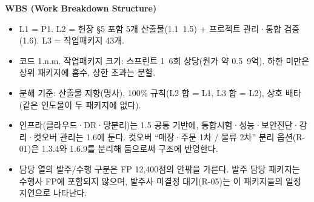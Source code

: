\documentclass[10pt,a4paper]{article}
\begin{document}
\clearpage
\begin{center}\bfseries\large WBS (Work Breakdown Structure)\end{center}
\begin{fieldbox}
\ifwbblank
{}\par\vspace{4mm}
\par\vspace{4mm}
\par\vspace{4mm}
\par\vspace{4mm}
\par\vspace{2mm}
\else
\begin{itemize}
\item L1 = P1. L2 = 헌장 §5 포함 5개 산출물(1.1~1.5) + 프로젝트 관리·통합 검증(1.6). L3 = 작업패키지 43개.
\item 코드 1.n.m. 작업패키지 크기: 스프린트 1~6회 상당(원가 약 0.5~9억). 하한 미만은 상위 패키지에 흡수, 상한 초과는 분할.
\item 분해 기준: 산출물 지향(명사), 100\% 규칙(L2 합 = L1, L3 합 = L2), 상호 배타(같은 인도물이 두 패키지에 없다).
\item 인프라(클라우드·DR·망분리)는 1.5 공통 기반에, 통합시험·성능·보안진단·감리·컷오버 관리는 1.6에 둔다. 컷오버 “매장·주문 1차 / 물류 2차” 분리 옵션(R-01)은 1.3.4와 1.6.9를 분리해 둠으로써 구조에 반영한다.
\item 담당 열의 발주/수행 구분은 FP 12,400점의 안팎을 가른다. 발주 담당 패키지는 수행사 FP에 포함되지 않으며, 발주사 미결정 대기(R-05)는 이 패키지들의 일정 지연으로 나타난다.
\end{itemize}\fi
\end{fieldbox}
\end{document}
